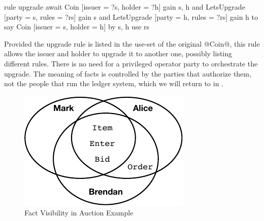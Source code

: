 \begin{small}
\begin{code}
  rule  upgrade
  await Coin [issuer = ?s, holder = ?h]   gain {s, h}
    and LetsUpgrade [party = s, rules = ?rs] gain {s}
    and LetsUpgrade [party = h, rules = ?rs] gain {h}
   to
    say Coin [issuer = s, holder = h]
     by {s, h} use rs
\end{code}
\end{small}

Provided the upgrade rule is listed in the use-set of the original @Coin@, this rule allows the issuer and holder to upgrade it to another one, possibly listing different rules. There is no need for a privileged operator party to orchestrate the upgrade. The meaning of facts is controlled by the parties that authorize them, not the people  that run the ledger system, which we will return to in \REF.


\begin{figure}
\begin{center}
\includegraphics{figure/auction-visibility.pdf}
\end{center}
\vspace{-2ex}
\caption{Fact Visibility in Auction Example}
\label{f:AuctionVisibility}
\end{figure}


